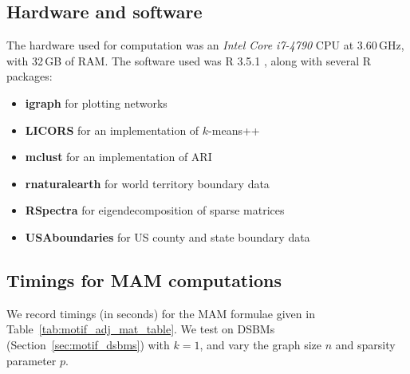\documentclass[12pt,draft]{ociamthesis}
\theoremstyle{plain}
\theoremstyle{definition}
\theoremstyle{remark}
\begin{document}
\subsection{Hardware and software} \label{sec:notes_hardware}

The hardware used for computation was an \emph{Intel Core i7-4790} CPU at
3.60\,GHz, with 32\,GB of RAM. The software used was R 3.5.1
\cite{r_rsoftware}, along with several R packages:
%
%
\begin{itemize}
\item \textbf{igraph} \cite{r_igraph} for plotting networks
\item \textbf{LICORS} \cite{r_LICORS} for an implementation of $k$-means++
\item \textbf{mclust} \cite{r_mclust} for an implementation of ARI
\item
\textbf{rnaturalearth} \cite{r_rnaturalearth} for world territory boundary
data
\item \textbf{RSpectra} \cite{r_RSpectra} for eigendecomposition of
sparse matrices
\item \textbf{USAboundaries} \cite{r_USAboundaries} for US
county and state boundary data
\end{itemize}

\subsection{Timings for MAM computations} \label{sec:notes_timing}

We record timings (in seconds) for the MAM formulae given in
Table~\ref{tab:motif_adj_mat_table}. We test on DSBMs
(Section~\ref{sec:motif_dsbms}) with $k=1$, and vary the graph size $n$ and
sparsity parameter $p$.
\end{document}
